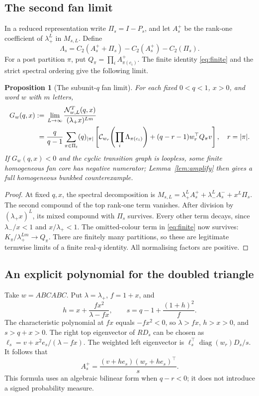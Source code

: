 \documentclass[11pt,a4paper]{article}
\newtheorem{proposition}[theorem]{Proposition}
\theoremstyle{remark}\newtheorem{remark}[theorem]{Remark}
\begin{document}
\subsection{The second fan limit}
In a reduced representation write $\Pi_s=I-P_s$, and let $A_s^{+}$ be the rank-one coefficient of $\lambda_+^L$ in $M_{s,L}$. Define
\[
\Lambda_s=C_2(A_s^{+}+\Pi_s)-C_2(A_s^{+})-C_2(\Pi_s).
\]
For a post partition $\pi$, put $Q_\pi=\prod_i A_{\pi(c_i)}^{+}$. The finite identity \eqref{eq:finite} and the strict spectral ordering give the following limit.
\begin{proposition}[The subunit-$q$ fan limit]\label{prop:belowlimit}
For each fixed $0<q<1$, $x>0$, and word $w$ with $m$ letters,
\begin{equation}\label{eq:belowlimit}
\begin{split}
G_w(q,x):={}&\lim_{L\to\infty}\frac{\mathcal N^T_{w,L}(q,x)}{(\lambda_+x)^{Lm}}\\
={}&\frac q{q-1}\sum_{\pi\in\Pi_t}(q)_{|\pi|}
\left[\mathcal C_{w_r}\!\left(\prod_i\Lambda_{\pi(c_i)}\right)
+(q-r-1)w_r^\top Q_\pi v\right],\quad r=|\pi|.
\end{split}
\end{equation}
If $G_w(q,x)<0$ and the cyclic transition graph is loopless, some finite homogeneous fan core has negative numerator; Lemma~\ref{lem:amplify} then gives a full homogeneous bunkbed counterexample.
\end{proposition}
\begin{proof}
At fixed $q,x$, the spectral decomposition is
$M_{s,L}=\lambda_+^L A_s^{+}+\lambda_-^L A_s^{-}+x^L\Pi_s$.
The second compound of the top rank-one term vanishes. After division by $(\lambda_+x)^L$, its mixed compound with $\Pi_s$ survives. Every other term decays, since $\lambda_-/x<1$ and $x/\lambda_+<1$. The omitted-colour term in \eqref{eq:finite} now survives: $K_\pi/\lambda_+^{Lm}\to Q_\pi$. There are finitely many partitions, so these are legitimate termwise limits of a finite real-$q$ identity. All normalising factors are positive.
\end{proof}

\subsection{An explicit polynomial for the doubled triangle}
Take $w=ABCABC$. Put $\lambda=\lambda_+$, $f=1+x$, and
\begin{equation}\label{eq:hs}
h=x+\frac{fx^2}{\lambda-fx},\qquad
s=q-1+\frac{(1+h)^2}{f}.
\end{equation}
The characteristic polynomial at $fx$ equals $-fx^2<0$, so $\lambda>fx$, $h>x>0$, and $s>q+x>0$.
The right top eigenvector of $RD_s$ can be chosen as
$\ell_s=v+x^2e_s/(\lambda-fx)$. The weighted left eigenvector is
$\ell_s^\top\operatorname{diag}(w_r)D_s/s$.
It follows that
\[
A_s^{+}=\frac{(v+he_s)(w_r+he_s)^\top}{s}.
\]
This formula uses an algebraic bilinear form when $q-r<0$; it does not introduce a signed probability measure.
\end{document}
